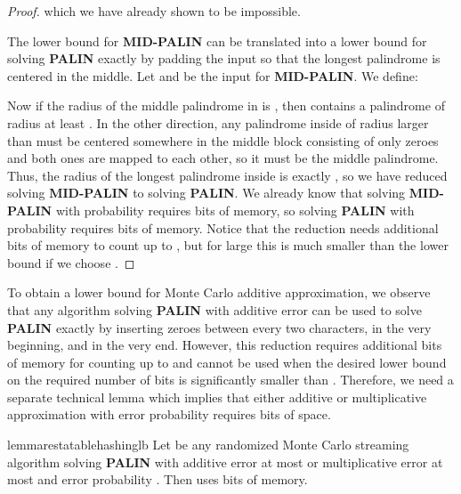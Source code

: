 \documentclass{article}[11pt,letter]
\newcommand{\midpalin}[1][n]{{\bf MID-PALIN}\xspace}
\newcommand{\palin}[1][n]{{\bf PALIN}\xspace}
\newcommand{\aerr}{\ensuremath{E}}
\begin{document}
\begin{proof}
which we have already shown to be impossible.

The lower bound for \midpalin can be translated into a lower bound for solving \palin exactly
by padding the input so that the longest palindrome is centered in the middle.
Let  and
 be the input for \midpalin. We define:

Now if the radius of the middle palindrome in  is , then  contains a palindrome of radius
at least . In the other direction, any palindrome inside  of radius larger than  must be centered somewhere
in the middle block consisting of only zeroes and both ones are mapped to each other, so it must be
the middle palindrome.
Thus, the radius of the longest palindrome inside  is exactly , so we have reduced solving \midpalin to solving
\palin[2n+2]. We already know that solving \midpalin[n] with probability 
requires  bits of memory,
so solving \palin[2n+2] with probability  requires  bits of memory.
Notice that the reduction needs  additional bits of memory to count up to , but for large  this is
much smaller than the lower bound if we choose .
\end{proof}


To obtain a lower bound for Monte Carlo additive approximation, we observe that any algorithm
solving \palin with additive error  can be used to solve \palin[\frac{n-\aerr}{\aerr+1}] exactly
by inserting  zeroes between every two characters, in the very beginning, and in the very end.
However, this reduction requires  additional bits of memory for counting up to 
and cannot be used when the desired lower bound on the required number of bits
 is significantly smaller than . 
Therefore, we need a separate technical lemma which implies that either additive or multiplicative
approximation with error probability  requires  bits of space.


\begin{restatable}{lemma}{restatablehashinglb}
\label{hashing_lb}
Let  be any randomized Monte Carlo streaming algorithm solving \palin with additive error at most  or multiplicative error at most
  and error probability .
Then  uses  bits of memory.
\end{restatable}
\end{document}
